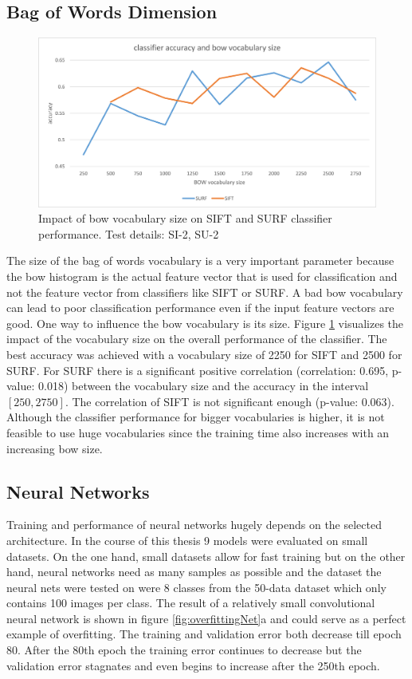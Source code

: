 	\subsection{Bag of Words Dimension}
	\begin{figure}[htb]
		\centering
		\includegraphics[width=\linewidth]{figures/results_bow}		
		\caption{Impact of bow vocabulary size on SIFT and SURF classifier performance. Test details: SI-2, SU-2}
		\label{fig:resultsBow}
	\end{figure}
	The size of the bag of words vocabulary is a very important parameter because the \gls{bow} histogram is the actual feature vector that is used for classification and not the feature vector from classifiers like SIFT or SURF. A bad \gls{bow} vocabulary can lead to poor classification performance even if the input feature vectors are good. One way to influence the \gls{bow} vocabulary is its size. Figure \ref{fig:resultsBow} visualizes the impact of the vocabulary size on the overall performance of the classifier. The best accuracy was achieved with a vocabulary size of 2250 for SIFT and 2500 for SURF. For SURF there is a significant positive correlation {(correlation: 0.695, p-value: 0.018)} between the vocabulary size and the accuracy in the interval $[250, 2750]$. The correlation of SIFT is not significant enough {(p-value: 0.063)}. Although the classifier performance for bigger vocabularies is higher, it is not feasible to use huge vocabularies since the training time also increases with an increasing \gls{bow} size.
	
	\subsection{Neural Networks}
			
	Training and performance of neural networks hugely depends on the selected architecture. In the course of this thesis 9 models were evaluated on small datasets. On the one hand, small datasets allow for fast training but on the other hand, neural networks need as many samples as possible and the dataset the neural nets were tested on were 8 classes from the 50-data dataset which only contains 100 images per class. The result of a relatively small convolutional neural network is shown in figure \ref{fig:overfittingNet}a and could serve as a perfect example of overfitting. The training and validation error both decrease till epoch 80. After the 80th epoch the training error continues to decrease but the validation error stagnates and even begins to increase after the 250th epoch.
	
